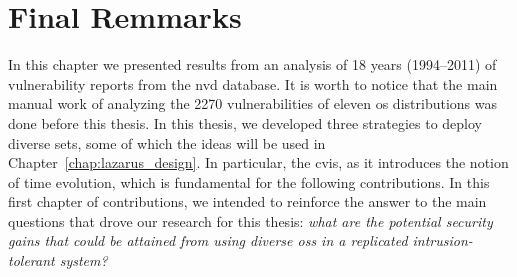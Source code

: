 \section{Final Remmarks}

In this chapter we presented results from an analysis of 18 years (1994--2011) of vulnerability reports from the \gls{nvd} database. 
It is worth to notice that the main manual work of analyzing the 2270 vulnerabilities of eleven \gls{os} distributions was done before this thesis. 
In this thesis, we developed three strategies to deploy diverse sets, some of which the ideas will be used in Chapter~\ref{chap:lazarus_design}.
In particular, the \gls{cvis}, as it introduces the notion of time evolution, which is fundamental for the following contributions.
In this first chapter of contributions, we intended to reinforce the answer to the main questions that drove our research for this thesis: 
\emph{what are the potential security gains that could be attained from using diverse \glspl{os} in a replicated intrusion-tolerant system?}
 
